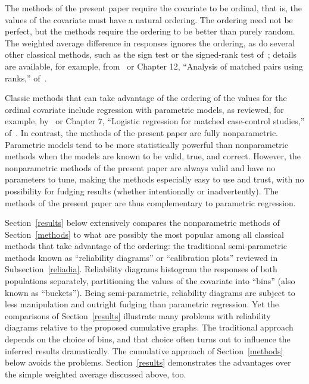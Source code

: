 \documentclass{article}
\begin{document}
The methods of the present paper require the covariate to be ordinal, that is,
the values of the covariate must have a natural ordering.
The ordering need not be perfect, but the methods require the ordering
to be better than purely random.
The weighted average difference in responses ignores the ordering,
as do several other classical methods, such as the sign test
or the signed-rank test of~\cite{wilcoxon};
details are available, for example, from~\cite{hollander-wolfe-chicken}
or Chapter 12, ``Analysis of matched pairs using ranks,''
of~\cite{brown-hollander}.

Classic methods that can take advantage of the ordering of the values
for the ordinal covariate include regression with parametric models,
as reviewed, for example, by~\cite{draper-smith}
or Chapter 7, ``Logistic regression for matched case-control studies,''
of~\cite{hosmer-lemeshow-sturdivant}.
In contrast, the methods of the present paper are fully nonparametric.
Parametric models tend to be more statistically powerful than nonparametric
methods when the models are known to be valid, true, and correct.
However, the nonparametric methods of the present paper are always valid
and have no parameters to tune, making the methods especially easy to use
and trust, with no possibility for fudging results (whether intentionally
or inadvertently). The methods of the present paper are thus complementary
to parametric regression.

Section~\ref{results} below extensively compares the nonparametric methods
of Section~\ref{methods} to what are possibly the most popular
among all classical methods that take advantage of the ordering:
the traditional semi-parametric methods known as ``reliability diagrams''
or ``calibration plots'' reviewed in Subsection~\ref{reliadia}.
Reliability diagrams histogram the responses of both populations separately,
partitioning the values of the covariate into ``bins''
(also known as ``buckets''). Being semi-parametric, reliability diagrams
are subject to less manipulation and outright fudging
than parametric regression. Yet the comparisons of Section~\ref{results}
illustrate many problems with reliability diagrams relative
to the proposed cumulative graphs.
The traditional approach depends on the choice of bins,
and that choice often turns out to influence the inferred results dramatically.
The cumulative approach of Section~\ref{methods} below avoids the problems.
Section~\ref{results} demonstrates the advantages
over the simple weighted average discussed above, too.
\end{document}
